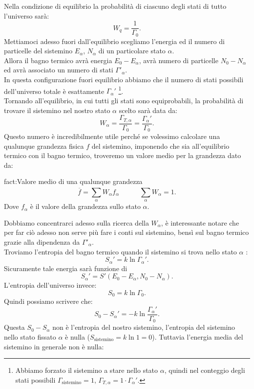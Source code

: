 Nella condizione di equilibrio la probabilità di ciascuno degli stati di tutto l'universo sarà:
\[
	W_{q}= \frac{1}{\Gamma_0}
.\]
Mettiamoci adesso fuori dall'equilibrio scegliamo l'energia ed il numero di particelle del sistemino $E_{\alpha}$, $N_{\alpha}$ di un particolare stato $\alpha$.\\
Allora il bagno termico avrà energia $E_0- E_{\alpha}$, avrà numero di particelle $N_0-N_{\alpha}$ ed avrà associato un numero di stati $\Gamma'_{\alpha}$.\\
In questa configurazione fuori equilibrio abbiamo che il numero di stati possibili dell'universo totale è esattamente $\Gamma_{\alpha}'$ \footnote{Abbiamo forzato il sistemino a stare nello stato $\alpha$, quindi nel conteggio degli stati possibili $\Gamma_{\text{sistemino}}=1$, $\Gamma_{T, \alpha}=1\cdot \Gamma_{\alpha}'$.}.\\
Tornando all'equilibrio, in cui tutti gli stati sono equiprobabili, la probabilità di trovare il sistemino nel nostro stato $\alpha$ scelto sarà data da:
\[
	W_{\alpha}= \frac{\Gamma_{T,\alpha}}{\Gamma_0}= \frac{\Gamma_{\alpha}'}{\Gamma_0}
.\] 
Questo numero è incredibilmente utile perché se volessimo calcolare una qualunque grandezza fisica $f$ del sistemino, imponendo che sia all'equilibrio termico con il bagno termico, troveremo un valore medio per la grandezza dato da:
\begin{fact}{fact:Valore medio di una qualunque grandezza}
\[
	\overline{f}= \sum_{\alpha}^{} W_{\alpha}f_{\alpha} \quad \quad \quad \sum_{\alpha}^{} W_\alpha= 1
.\] 
Dove $f_{\alpha}$ è il valore della grandezza sullo stato $\alpha$.
\end{fact}
Dobbiamo concentrarci adesso sulla ricerca della $W_{\alpha}$, è interessante notare che per far ciò adesso non serve più fare i conti sul sistemino, bensì sul bagno termico grazie alla dipendenza da $\Gamma'_{\alpha}$.\\
Troviamo l'entropia del bagno termico quando il sistemino si trova nello stato $\alpha$ :
\[
	S_{\alpha}'= k\ln\Gamma_{\alpha}'
.\] 
Sicuramente tale energia sarà funzione di 
\[
	S_{\alpha}'= S'\left( E_0-E_{\alpha}, N_0-N_{\alpha} \right) 
.\] 
L'entropia dell'universo invece:
\[
	S_0= k \ln \Gamma_0
.\] 
Quindi possiamo scrivere che:
\[
	S_0-S_{\alpha}'= -k \ln \frac{\Gamma_{\alpha}'}{\Gamma_0}
	\label{eq:Walpha}
.\] 
Questa $S_0- S_{\alpha}$ non è l'entropia del nostro sistemino, l'entropia del sistemino nello stato fissato $\alpha$ è nulla ($S_{\text{sistemino}} = k\ln1
=0$). Tuttavia l'energia media del sistemino in generale non è nulla:
